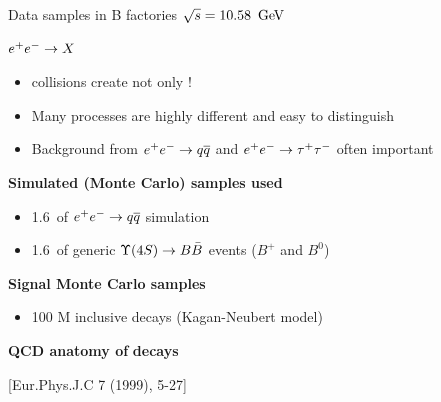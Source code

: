 \documentclass[xcolor=dvipsnames]{beamer}
\begin{document}
   \begin{frame}{Data samples in B factories}
      \scriptsize\centering
      \textbf{$\sqrt{s} = 10.58~\mathrm{\,Ge\kern -0.1em V}$} 
      
      $e^+e^-\rightarrow X$

      \vspace{10pt}

      \begin{itemize}
         \item \epem collisions create not only \FourS!
         \item Many processes are highly different and easy to distinguish
         \item Background from $e^+e^-\rightarrow q\overline q$ and $e^+e^-\rightarrow\tau^+\tau^-$ often important
      \end{itemize}
   \begin{flushleft}
   \textbf{Simulated (Monte Carlo) samples used}
   \end{flushleft}
   \begin{itemize}
      \vspace{-5pt}
      \item 1.6~\invab of $e^+e^-\rightarrow q\overline q$ simulation
      \item 1.6~\invab of generic $\FourS\ra B\bar{B}$ events ($B^+$ and $B^0$)
   \end{itemize}
   \begin{flushleft}
   \textbf{Signal Monte Carlo samples}
   \end{flushleft}
   \begin{itemize}
      \vspace{-5pt}
      \item 100 M inclusive \BtoXsgamma decays (Kagan-Neubert model) 
   \end{itemize}
   \begin{flushright}
      \tiny
      \textbf{QCD anatomy of}  \textbf{decays}
       
      [Eur.Phys.J.C 7 (1999), 5-27]
   \end{flushright}
      
   \end{frame}
\end{document}
